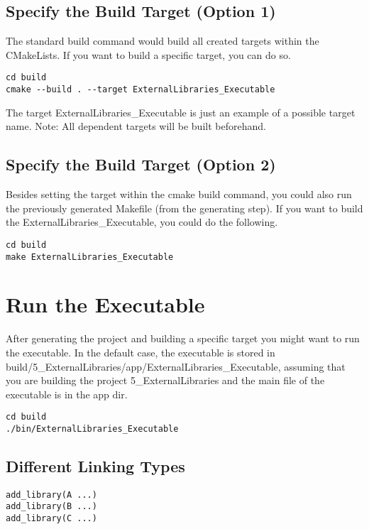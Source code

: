 \documentclass[openany]{report}
\begin{document}
\subsection{Specify the Build Target (Option 1)}

The standard build command would build all created targets within the CMakeLists.
If you want to build a specific target, you can do so.

\begin{verbatim}
cd build
cmake --build . --target ExternalLibraries_Executable
\end{verbatim}

The target ExternalLibraries\_Executable is just an example of a possible target name.
Note: All dependent targets will be built beforehand.

\subsection{Specify the Build Target (Option 2)}


Besides setting the target within the cmake build command, you could also run the previously generated Makefile (from the generating step).
If you want to build the ExternalLibraries\_Executable, you could do the following.

\begin{verbatim}
cd build
make ExternalLibraries_Executable
\end{verbatim}


\section{Run the Executable}

After generating the project and building a specific target you might want to run the executable.
In the default case, the executable is stored in build/5\_ExternalLibraries/app/ExternalLibraries\_Executable, assuming that you are building the project 5\_ExternalLibraries and the main file of the executable is in the app dir.

\begin{verbatim}
cd build
./bin/ExternalLibraries_Executable
\end{verbatim}


\subsection{Different Linking Types}

\begin{verbatim}
add_library(A ...)
add_library(B ...)
add_library(C ...)
\end{verbatim}
\end{document}
